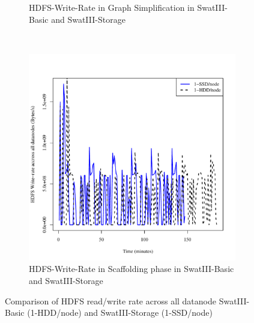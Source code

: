 \documentclass[conference]{IEEEtran}
\begin{document}
\begin{figure}[htb]
\begin{subfigure}[b]{0.3\textwidth}
                \caption{HDFS-Write-Rate in Graph Simplification in SwatIII-Basic and SwatIII-Storage}
                \label{fig:ECHddSsdHdfsWrIops}
        \end{subfigure}
        ~ %
        \begin{subfigure}[b]{0.3\textwidth}
                \includegraphics[width=\textwidth]{Figure/SystemData/Plots/SCFHddSsdHdfsWrIops.pdf}
                \caption{HDFS-Write-Rate in Scaffolding phase in SwatIII-Basic and SwatIII-Storage}
                \label{fig:SCFHddSsdHdfsWrIops}
        \end{subfigure}        
        \caption{Comparison of HDFS read/write rate across all datanode SwatIII-Basic (1-HDD/node) and SwatIII-Storage (1-SSD/node)}\label{fig:HddSsdHdfsRWps}
        
\end{figure}
\end{document}
